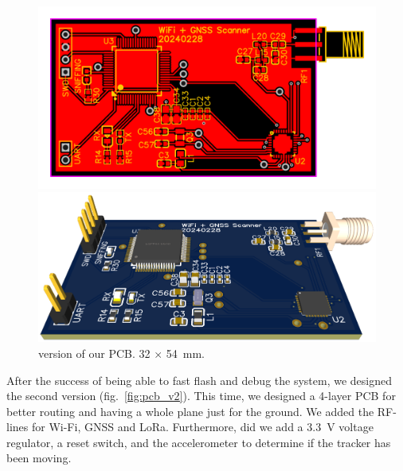 \begin{figure}[H]
    \centering
    \begin{minipage}[c]{0.49\textwidth}
        \centering
        \includegraphics[width=\textwidth]{figures/PCB_v1.png}
    \end{minipage}
    \hfill
    \begin{minipage}[c]{0.49\textwidth}
        \centering
        \includegraphics[width=\textwidth]{figures/PCB_v1_3D.png}
    \end{minipage}
    \caption{ version of our PCB. \si{32} $\times$ \SI{54}{\milli\meter}.}
    \label{fig:pcb_v1}
\end{figure}

After the success of being able to fast flash and debug the system, we designed the second version (fig.~\ref{fig:pcb_v2}). This time, we designed a 4-layer \ac{PCB} for better routing and having a whole plane just for the ground. We added the \ac{RF}-lines for Wi-Fi, \ac{GNSS} and \ac{LoRa}. Furthermore, did we add a \SI{3.3}{\volt} voltage regulator, a reset switch, and the accelerometer to determine if the tracker has been moving.

